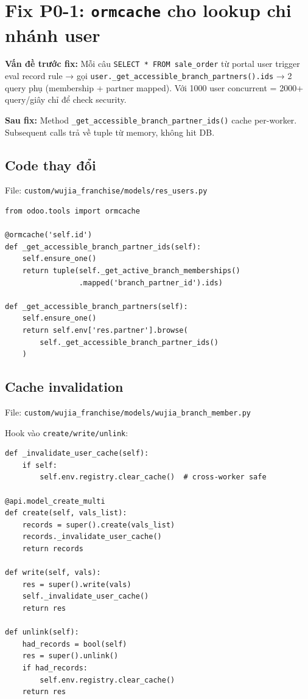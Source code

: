 \section{Fix P0-1: \texttt{ormcache} cho lookup chi nhánh user}

\textbf{Vấn đề trước fix:} Mỗi câu \texttt{SELECT * FROM sale\_order} từ portal user
trigger eval record rule → gọi \texttt{user.\_get\_accessible\_branch\_partners().ids}
→ 2 query phụ (membership + partner mapped). Với 1000 user concurrent =
2000+ query/giây chỉ để check security.

\textbf{Sau fix:} Method \texttt{\_get\_accessible\_branch\_partner\_ids()} cache
per-worker. Subsequent calls trả về tuple từ memory, không hit DB.

\subsection{Code thay đổi}

File: \texttt{custom/wujia\_franchise/models/res\_users.py}

\begin{lstlisting}[style=python]
from odoo.tools import ormcache

@ormcache('self.id')
def _get_accessible_branch_partner_ids(self):
    self.ensure_one()
    return tuple(self._get_active_branch_memberships()
                 .mapped('branch_partner_id').ids)

def _get_accessible_branch_partners(self):
    self.ensure_one()
    return self.env['res.partner'].browse(
        self._get_accessible_branch_partner_ids()
    )
\end{lstlisting}

\subsection{Cache invalidation}

File: \texttt{custom/wujia\_franchise/models/wujia\_branch\_member.py}

Hook vào \texttt{create/write/unlink}:

\begin{lstlisting}[style=python]
def _invalidate_user_cache(self):
    if self:
        self.env.registry.clear_cache()  # cross-worker safe

@api.model_create_multi
def create(self, vals_list):
    records = super().create(vals_list)
    records._invalidate_user_cache()
    return records

def write(self, vals):
    res = super().write(vals)
    self._invalidate_user_cache()
    return res

def unlink(self):
    had_records = bool(self)
    res = super().unlink()
    if had_records:
        self.env.registry.clear_cache()
    return res
\end{lstlisting}

